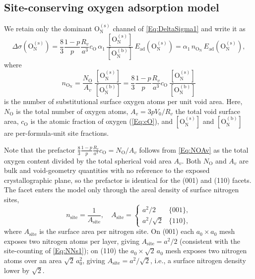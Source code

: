 \documentclass[preprint,12pt,sort&compress]{elsarticle}
\newcommand{\?}{\stackrel{?}{=}}
\begin{document}
\subsection{Site-conserving oxygen adsorption model}
\label{App:110:model}

We retain only the dominant $\text{O}_\text{N}^{(\text{s})}$ channel of \cref{Eq:DeltaSigma1} and write it as
\begin{equation}
\Delta\sigma(\text{O}_\text{N}^{(\text{s})}) = \frac{8}{3} \frac{1-p}{p} \frac{R_v}{a^3} c_\text{O} \, \alpha_1 \,
\frac{[\text{O}_\text{N}^{(\text{s})}]}{[\text{O}_\text{N}^{(\text{b})}]} \,
E_\text{ad}(\text{O}_\text{N}^{(\text{s})}) = \alpha_1 \, n_{\text{O}_\text{N}} \, E_\text{ad}(\text{O}_\text{N}^{(\text{s})}),
\label{Eq:110:ON}
\end{equation}
where
\begin{equation}
n_{\text{O}_\text{N}} = \frac{N_\text{O}}{A_v} \, \frac{[\text{O}_\text{N}^{(\text{s})}]}{[\text{O}_\text{N}^{(\text{b})}]}
= \frac{8}{3} \frac{1-p}{p} \frac{R_v}{a^3}c_\text{O} \,
\frac{[\text{O}_\text{N}^{(\text{s})}]}{[\text{O}_\text{N}^{(\text{b})}]}
\label{Eq:110:nON}
\end{equation}
is the number of substitutional surface oxygen atoms per unit void area. Here, $N_\text{O}$ is the total number of oxygen atoms, $A_v = 3pV_0/R_v$ the total void surface area, $c_\text{O}$ is the atomic fraction of oxygen (\cref{Eq:cO}), and $[\text{O}_\text{N}^{(\text{s})}]$ and $[\text{O}_\text{N}^{(\text{b})}]$ are per-formula-unit site fractions.

Note that the prefactor $\tfrac{8}{3}\tfrac{1-p}{p}\tfrac{R_v}{a^3}c_\text{O}=N_\text{O}/A_v$ follows from \cref{Eq:NOAv} as the total oxygen content divided by the total spherical void area $A_v$. Both $N_\text{O}$ and $A_v$ are bulk and void-geometry quantities with no reference to the exposed crystallographic plane, so the prefactor is identical for the (001) and (110) facets. The facet enters the model only through the areal density of surface nitrogen sites,
\begin{equation}
n_\text{site} = \frac{1}{A_\text{site}},
\quad
A_\text{site} = \begin{cases}
                    a^2/2        & \{001\}, \\
                    a^2/\sqrt{2} & \{110\},
                \end{cases}
\label{Eq:110:nsite}
\end{equation}
where $A_\text{site}$ is the surface area per nitrogen site. On (001) each $a_0 \times a_0$ mesh exposes two nitrogen atoms per layer, giving $A_\text{site}=a^2/2$ (consistent with the site-counting of \cref{Eq:NNs1}); on (110) the $a_0 \times \sqrt{2} \, a_0$ mesh exposes two nitrogen atoms over an area $\sqrt{2}\,a_0^2$, giving $A_\text{site}=a^2/\sqrt{2}$, i.e., a surface nitrogen density lower by $\sqrt{2}$.
\end{document}
